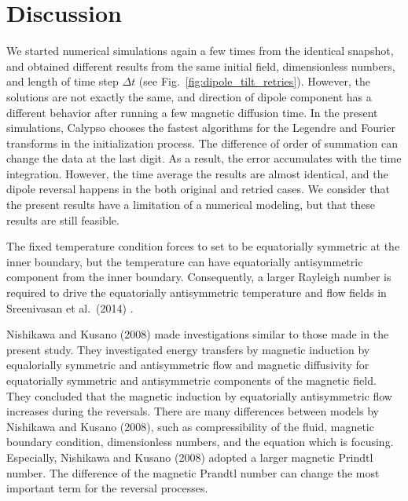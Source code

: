 \section{Discussion}
\label{section:discussion}

We started {\color{red} numerical} simulations again a few times from the 
{\color{red} identical}
snapshot, and obtained different results from the same initial field, dimensionless numbers, and length of time step $\Delta t$ (see Fig.~\ref{fig:dipole_tilt_retries}). 
However, the solutions are not exactly the same, and direction of dipole component has a different behavior after running a few magnetic diffusion time. 
In the present simulations, Calypso chooses the fastest algorithms for the Legendre and Fourier transforms in the initialization process. 
The difference of order of summation can change the data at the last digit. 
As a result, the error accumulates with the time integration. However, the time average the results are almost identical, and the dipole reversal happens in the both original and retried cases. 
We consider that the present results have a limitation of a numerical modeling, but that these results are still feasible.

The fixed temperature condition forces to set to be equatorially symmetric at the inner boundary, but the temperature can have equatorially antisymmetric component from the inner boundary. 
Consequently, a larger Rayleigh number is required to drive the equatorially antisymmetric temperature and flow fields in Sreenivasan et al.\ (2014) \cite{Sreenivasan:2014}.

Nishikawa and Kusano (2008) \cite{Nishikawa:2008} made  investigations similar to {\color{red} those made in} the present study.
They investigated energy 
{\color{red} transfers} 
by magnetic induction by equalorially symmetric and antisymmetric flow and magnetic diffusivity for equatorially symmetric and antisymmetric components of the magnetic field. 
They concluded that the magnetic induction by equatorially antisymmetric flow increases during the reversals. 
There are many differences between models by Nishikawa and Kusano (2008), such as compressibility of the fluid, magnetic boundary condition, dimensionless numbers, and the equation which is focusing. Especially, Nishikawa and Kusano (2008) adopted a larger magnetic Prindtl number. 
The difference of the magnetic Prandtl number can change the most important term for the reversal processes.

